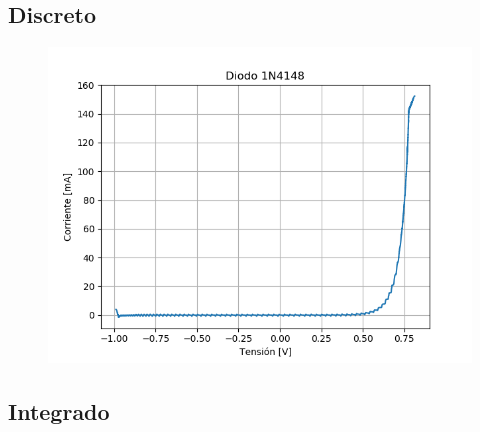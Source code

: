 \documentclass[a4paper,11pt]{article}
\begin{document}
	\subsection{Discreto}
	
	\begin{figure}[h]
		\centering
		\includegraphics[width=\textwidth]{imagenes/Diodo1N4148.png}
		\caption{}
	\end{figure}
	
	\subsection{Integrado}
	
\end{document}

